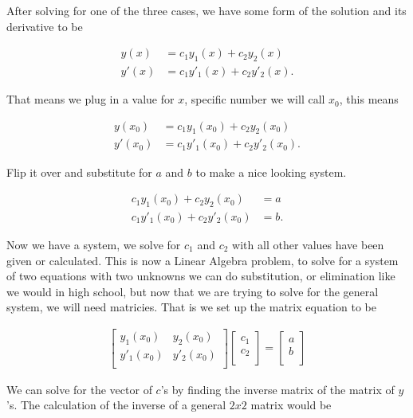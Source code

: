 \documentclass[12pt]{article}
\begin{document}
After solving for one of the three cases, we have some form of the solution and its derivative to be

\begin{align*}
    y(x) &= c_1y_1(x)+c_2y_2(x) \\
    y'(x) &= c_1y'_1(x)+c_2y'_2(x).
\end{align*}

That means we plug in a value for $x$, specific number we will call $x_0$, this means

\begin{align*}
    y(x_0) &= c_1y_1(x_0)+c_2y_2(x_0) \\
    y'(x_0) &= c_1y'_1(x_0)+c_2y'_2(x_0).
\end{align*}

Flip it over and substitute for $a$ and $b$ to make a nice looking system.

\begin{align*}
    c_1y_1(x_0)+c_2y_2(x_0) &= a \\
    c_1y'_1(x_0)+c_2y'_2(x_0) &= b.
\end{align*}

Now we have a system, we solve for $c_1$ and $c_2$ with all other values have been given or calculated. This is now a Linear Algebra problem, to solve for a system of two equations with two unknowns we can do substitution, or elimination like we would in high school, but now that we are trying to solve for the general system, we will need matricies. That is we set up the matrix equation to be

\begin{align*}
    \left[
\begin{array}{cc}
y_1(x_0) & y_2(x_0) \\
y'_1(x_0) & y'_2(x_0) \\
\end{array}
\right]
\left[
\begin{array}{c}
c_1 \\
c_2 \\
\end{array}
\right] =
\left[
\begin{array}{c}
a \\
b \\
\end{array}
\right]
\end{align*}

We can solve for the vector of $c$'s by finding the inverse matrix of the matrix of $y$'s. The calculation of the inverse of a general $2x2$ matrix would be
\end{document}
